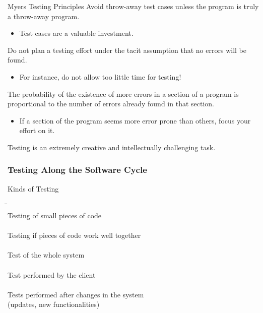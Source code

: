 \begin{Frame}[allowframebreaks]{Myers Testing Principles}
  \textcolor{maincolor}{Avoid throw-away test cases unless the program is truly a throw-away program.}
  \begin{itemize}
    \item Test cases are \alert{a valuable investment.}
  \end{itemize}
  
  \framebreak

  \textcolor{maincolor}{Do not plan a testing effort under the tacit assumption that no errors will be found.}
  \begin{itemize}
    \item For instance, do not allow too little time for testing!
  \end{itemize}

  \textcolor{maincolor}{The probability of the existence of more errors in a section of a program is proportional to the number of errors already found in that section.}
  \begin{itemize}
    \item If a section of the program seems more error prone than others, focus your effort on it.
  \end{itemize}

  \textcolor{maincolor}{Testing is an extremely creative and intellectually challenging task.}
\end{Frame}

\subsubsection*{Testing Along the Software Cycle}

\begin{Frame}{Kinds of Testing}
  \begin{tabbing}
     \qquad \= \\
    Testing of small pieces of code\\[1ex]
     \>\\
    Testing if pieces of code work well together\\[1ex]
     \>\\
    Test of the whole system\\[1ex]
     \>\\
    Test performed by the client\\[1ex]
    \\
    Tests performed after changes in the system\\
    (updates, new functionalities)
  \end{tabbing}
\end{Frame}

